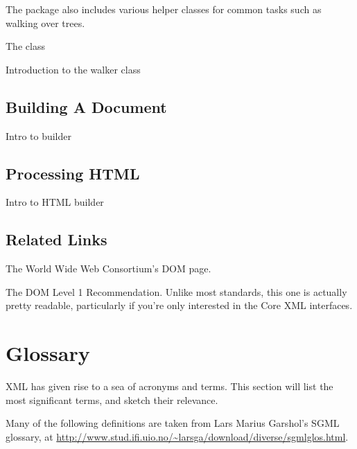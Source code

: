 \documentclass{howto}
\begin{document}
The  package also includes various helper classes for
common tasks such as walking over trees.

The  class

Introduction to the walker class

\subsection{Building A Document}

Intro to builder

\subsection{Processing HTML}

Intro to HTML builder


\subsection{Related Links}

\begin{definitions}
%
The World Wide Web Consortium's DOM page.

%
The DOM Level 1 Recommendation.  Unlike most standards, this one is
actually pretty readable, particularly if you're only interested in
the Core XML interfaces.  

\end{definitions}



\section{Glossary}

XML has given rise to a sea of acronyms and terms.  This section will
list the most significant terms, and sketch their relevance.

Many of the following definitions are taken from Lars Marius Garshol's
SGML glossary, at \url{http://www.stud.ifi.uio.no/\~larsga/download/diverse/sgmlglos.html}.
\end{document}
